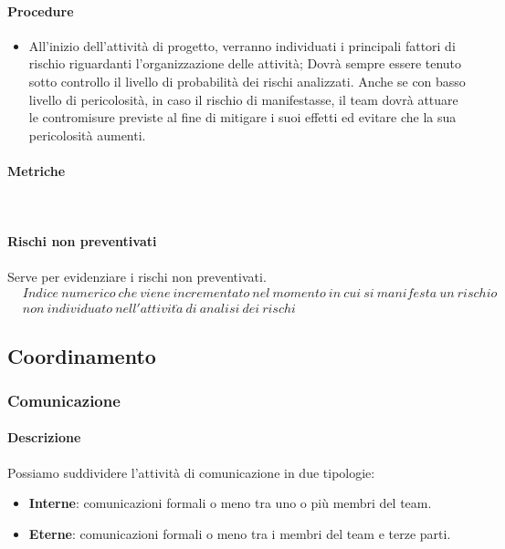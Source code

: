 \documentclass[../NormeDiProgetto_v4.0.0.tex]{subfiles}
\begin{document}
			\paragraph{Procedure}
			\begin{itemize}
			\item All'inizio dell'attività di progetto, verranno individuati i principali fattori di rischio riguardanti l'organizzazione delle attività;
			Dovrà sempre essere tenuto sotto controllo il livello di probabilità dei rischi analizzati. Anche se con basso livello di pericolosità, in caso il rischio di manifestasse, il team dovrà attuare le contromisure previste al fine di mitigare i suoi effetti ed evitare che la sua pericolosità aumenti.
			\end{itemize}
			\paragraph{Metriche}\mbox{}\\
				\paragraph{Rischi non preventivati}
				Serve per evidenziare i rischi non preventivati.
				\begin{equation*}
				\begin{split}
					&Indice \ numerico \ che \ viene \ incrementato \ nel \ momento \ in \ cui \ si \ manifesta \ un \ rischio \\ 
					&non \ individuato \ nell'attivit\grave{a} \ di \ analisi \ dei \ rischi
				\end{split}
				\end{equation*}	
	

	\subsection{Coordinamento}
		\subsubsection{Comunicazione}
			\paragraph{Descrizione}
				Possiamo suddividere l'attività di comunicazione in due tipologie:
				\begin{itemize}
					\item \textbf{Interne}: comunicazioni formali o meno tra uno o più membri del team.
					\item \textbf{Eterne}: comunicazioni formali o meno tra i membri del team e terze parti.
				\end{itemize}
			
\end{document}
